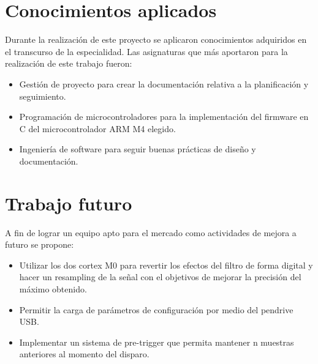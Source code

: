 \section{Conocimientos aplicados}

Durante la realización de este proyecto se aplicaron conocimientos adquiridos en el transcurso de la especialidad. Las asignaturas que más aportaron para la realización de este trabajo fueron:
\begin{itemize}
\item Gestión de proyecto para crear la documentación relativa a la planificación y seguimiento.
\item Programación de microcontroladores para la implementación del firmware en C del microcontrolador ARM M4 elegido.
\item Ingeniería de software para seguir buenas prácticas de diseño y documentación.
\end{itemize}

\section{Trabajo futuro}
A fin de lograr un equipo apto para el mercado como actividades de mejora a futuro se propone:
\begin{itemize}
\item Utilizar los dos cortex M0 para revertir los efectos del filtro de forma digital y hacer un resampling de la señal con el objetivos de mejorar la precisión del máximo obtenido.
\item Permitir la carga de parámetros de configuración por medio del pendrive USB. 
\item Implementar un sistema de pre-trigger que permita mantener n muestras anteriores al momento del disparo.
\end{itemize}
